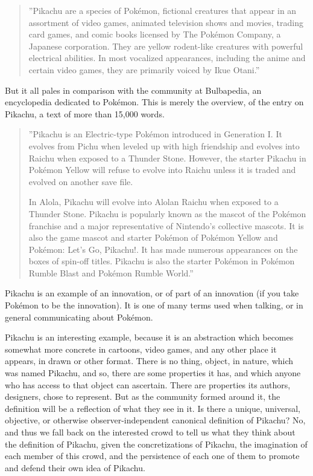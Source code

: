 \begin{quote}
''Pikachu are a species of Pok\'{e}mon, fictional creatures that appear in an assortment of video games, animated television shows and movies, trading card games, and comic books licensed by The Pok\'{e}mon Company, a Japanese corporation. They are yellow rodent-like creatures with powerful electrical abilities. In most vocalized appearances, including the anime and certain video games, they are primarily voiced by Ikue Otani.'' \cite{wikipedia-pikachu}
\end{quote}

But it all pales in comparison with the community at Bulbapedia, an encyclopedia dedicated to Pok\'{e}mon. This is merely the overview, of the entry on Pikachu, a text of more than 15,000 words.

\begin{quote}
''Pikachu is an Electric-type Pok\'{e}mon introduced in Generation I.
It evolves from Pichu when leveled up with high friendship and evolves into Raichu when exposed to a Thunder Stone. However, the starter Pikachu in Pok\'{e}mon Yellow will refuse to evolve into Raichu unless it is traded and evolved on another save file.

In Alola, Pikachu will evolve into Alolan Raichu when exposed to a Thunder Stone.
Pikachu is popularly known as the mascot of the Pok\'{e}mon franchise and a major representative of Nintendo's collective mascots.
It is also the game mascot and starter Pok\'{e}mon of Pok\'{e}mon Yellow and Pok\'{e}mon: Let's Go, Pikachu!. It has made numerous appearances on the boxes of spin-off titles. Pikachu is also the starter Pok\'{e}mon in Pok\'{e}mon Rumble Blast and Pok\'{e}mon Rumble World.'' \cite{bulbapedia-pikachu}
\end{quote}

Pikachu is an example of an innovation, or of part of an innovation (if you take Pok\'{e}mon to be the innovation). It is one of many terms used when talking, or in general communicating about Pok\'{e}mon. 

Pikachu is an interesting example, because it is an abstraction which becomes somewhat more concrete in cartoons, video games, and any other place it appears, in drawn or other format. There is no thing, object, in nature, which was named Pikachu, and so, there are some properties it has, and which anyone who has access to that object can ascertain. There are properties its authors, designers, chose to represent. But as the community formed around it, the definition will be a reflection of what they see in it. Is there a unique, universal, objective, or otherwise observer-independent canonical definition of Pikachu? No, and thus we fall back on the interested crowd to tell us what they think about the definition of Pikachu, given the concretizations of Pikachu, the imagination of each member of this crowd, and the persistence of each one of them to promote and defend their own idea of Pikachu.

